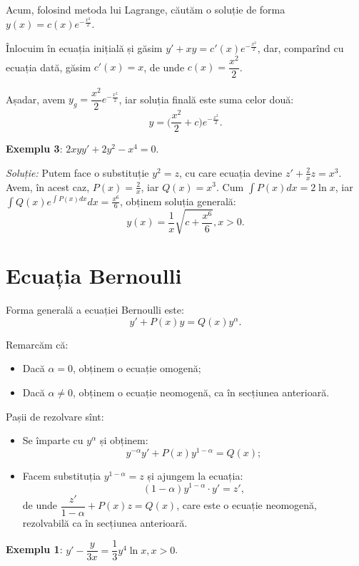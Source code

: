 Acum, folosind metoda lui Lagrange, căutăm o soluție de forma $y(x) = c(x) e^{-\frac{x^2}{2}}$.

Înlocuim în ecuația inițială și găsim $y' + xy = c'(x) e^{-\frac{x^2}{2}}$, dar, comparînd
cu ecuația dată, găsim $c'(x) = x$, de unde $c(x) = \dfrac{x^2}{2}$.

Așadar, avem $y_g = \dfrac{x^2}{2} e^{-\frac{x^2}{2}}$, iar soluția finală este suma celor două:
\[
  y = \Big( \frac{x^2}{2} + c \Big) e^{-\frac{x^2}{2}}.
\]

\vspace{0.5cm}

\textbf{Exemplu 3}: $2xyy' + 2y^2 - x^4 = 0$.

\emph{Soluție:} Putem face o substituție $y^2 = z$, cu care
ecuația devine $z' + \frac{2}{x} z = x^3$. Avem, în acest caz, $P(x) = \frac{2}{x}$,
iar $Q(x) = x^3$. Cum $\int P(x) dx = 2 \ln x$, iar $\int Q(x) e^{\int P(x) dx} dx = \frac{x^6}{6}$,
obținem soluția generală:
\[
  y(x) = \frac{1}{x} \sqrt{c + \frac{x^6}{6}}, x > 0.
\]


\section{Ecuația Bernoulli}
\label{sec:bernoulli}

Forma generală a ecuației Bernoulli este:
\[
  y' + P(x) y = Q(x) y^\alpha.
\]

Remarcăm că:
\begin{itemize}
\item Dacă $\alpha = 0$, obținem o ecuație omogenă;
\item Dacă $\alpha \neq 0$, obținem o ecuație neomogenă, ca în secțiunea anterioară.
\end{itemize}

Pașii de rezolvare sînt:
\begin{itemize}
\item Se împarte cu $y^\alpha$ și obținem:
  \[
    y^{-\alpha} y' + P(x) y^{1 - \alpha} = Q(x);
  \]
\item Facem substituția $y^{1 - \alpha} = z$ și ajungem la ecuația:
  \[
    (1 - \alpha) y^{1 - \alpha} \cdot y' = z',
\]
de unde $\dfrac{z'}{1 - \alpha} + P(x) z = Q(x)$, care este o ecuație
neomogenă, rezolvabilă ca în secțiunea anterioară.
\end{itemize}

\textbf{Exemplu 1}: $y' - \dfrac{y}{3x} = \dfrac{1}{3} y^4 \ln x, x > 0$.

